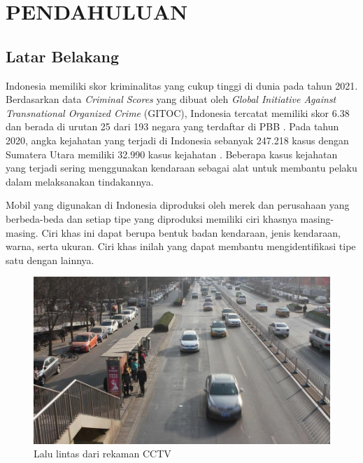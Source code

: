 \chapter{PENDAHULUAN}
\label{chap:pendahuluan}

\section{Latar Belakang}
\label{sec:latarbelakang}

Indonesia memiliki skor kriminalitas yang cukup tinggi di dunia pada tahun 2021. \linebreak
Berdasarkan data \emph{Criminal Scores} yang dibuat oleh \emph{Global Initiative Against Transnational Organized Crime} 
(GITOC), Indonesia tercatat memiliki skor 6.38 dan berada di urutan 25 dari 193 negara yang 
terdaftar di PBB \parencite{Gitoc2021}. Pada tahun 2020, angka kejahatan yang terjadi di Indonesia 
sebanyak 247.218 kasus dengan Sumatera Utara memiliki 32.990 kasus kejahatan \parencite{Bpskriminal2021}.
Beberapa kasus kejahatan yang terjadi sering menggunakan kendaraan sebagai alat untuk membantu pelaku 
dalam melaksanakan tindakannya.

Mobil yang digunakan di Indonesia diproduksi oleh merek dan perusahaan yang berbeda-beda 
dan setiap tipe yang diproduksi memiliki ciri khasnya masing-masing. Ciri khas ini dapat 
berupa bentuk badan kendaraan, jenis kendaraan, warna, serta ukuran. Ciri khas inilah 
yang dapat membantu mengidentifikasi tipe satu dengan lainnya.

\begin{figure}[ht]
      \centering
      \includegraphics[scale=0.3]{gambar/Mobil.jpg}
      \caption{Lalu lintas dari rekaman CCTV}
      \label{fig:RekamanCCTV}
\end{figure}

